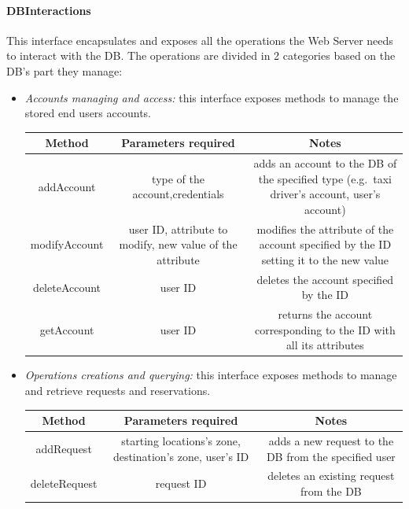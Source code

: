 \documentclass{article}
\begin{document}
\paragraph{DBInteractions}
This interface encapsulates and exposes all the operations the Web Server needs to interact with the DB\@. The operations are divided in 2 categories based on the DB's part they manage:
\begin{itemize}	
	\item \textit{Accounts managing and access:} this interface exposes methods to manage the stored end users accounts.\\	
	
	\begin{table}[H]
		\centering
		\begin{tabular}{*{3}{c}}
			\toprule
			Method & Parameters required & Notes \\
			\midrule
			addAccount & type of the account,credentials & adds an account to the DB of the specified type (e.g.\ taxi driver's account, user's account) \\
			modifyAccount & user ID, attribute to modify, new value of the attribute & modifies the attribute of the account specified by the ID setting it to the new value\\ 
			deleteAccount & user ID & deletes the account specified by the ID \\
			getAccount & user ID & returns the account corresponding to the ID with all its attributes \\
			\bottomrule
		\end{tabular}	
	\end{table}
	\item \textit{Operations creations and querying:} this interface exposes methods to manage and retrieve requests and reservations.\\	
		\begin{tabular}{*{3}{c}}
			\toprule
			Method & Parameters required & Notes \\
			\midrule
			addRequest & starting locations's zone, destination's zone, user's ID & adds a new request to the DB from the specified user\\ %
			deleteRequest & request ID & deletes an existing request from the DB\\ 

\end{tabular}
\end{itemize}
\end{document}
